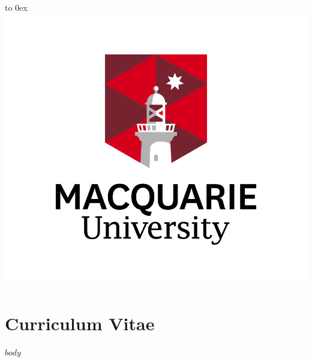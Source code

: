 \documentclass[10pt, a4paper]{article}
\begin{document}
\begin{flushright}%
    \vbox to 0ex{\includegraphics[scale=0.6]{images/newmulogo.png}\vss}%
\end{flushright}%

\section{Curriculum Vitae}

$body$
\end{document}
